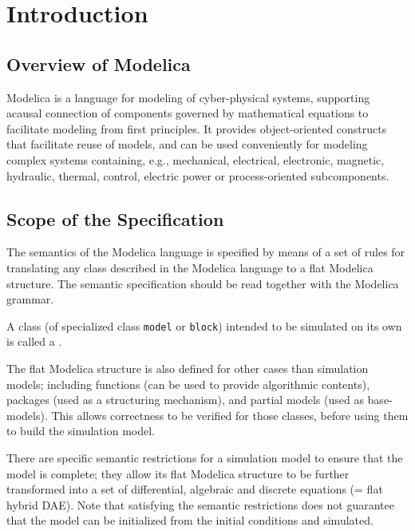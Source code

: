 \chapter{Introduction}\label{introduction1}

\section{Overview of Modelica}\label{overview-of-modelica}

Modelica is a language for modeling of cyber-physical systems, supporting acausal connection of components governed by mathematical equations to facilitate modeling from first principles.
It provides object-oriented constructs that facilitate reuse of models, and can be used conveniently for modeling complex systems containing, e.g., mechanical, electrical, electronic, magnetic, hydraulic, thermal, control, electric power or process-oriented subcomponents.

\section{Scope of the Specification}\label{scope-of-the-specification}

The semantics of the Modelica language is specified by means of a set of rules for translating any class described in the Modelica language to a flat Modelica structure.
The semantic specification should be read together with the Modelica grammar.

A class (of specialized class \lstinline!model! or \lstinline!block!) intended to be simulated on its own is called a .

The flat Modelica structure is also defined for other cases than simulation models; including functions (can be used to provide algorithmic contents), packages (used as a structuring mechanism), and partial models (used as base-models).
This allows correctness to be verified for those classes, before using them to build the simulation model.

There are specific semantic restrictions for a simulation model to ensure that the model is complete; they allow its flat Modelica structure to be further transformed into a set of differential, algebraic and discrete equations (= flat hybrid DAE).
Note that satisfying the semantic restrictions does not guarantee that the model can be initialized from the initial conditions and simulated.

